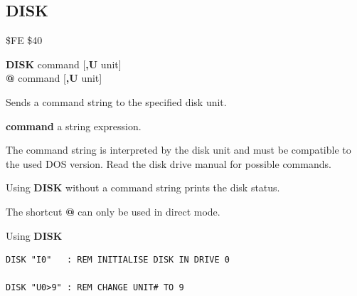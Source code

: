 \subsection{DISK}
\begin{description}[leftmargin=2cm,style=nextline]
\item [Token:]    \$FE \$40

\item [Format:]   {\bf DISK} command [{\bf,U} unit] \\
                  {\bf @} command [{\bf,U} unit]

\item [Usage:]    Sends a command string to the specified disk unit.

                  \unitdefinition

                  {\bf command} a string expression.

\item [Remarks:]  The command string is interpreted by the disk unit and must be compatible to the used DOS version. Read the disk drive manual for possible commands.

                  Using {\bf DISK} without a command string prints the disk status.

                  The shortcut {\bf @} can only be used in direct mode.

\item [Examples:] Using {\bf DISK}

\begin{tcolorbox}[colback=black,coltext=white]
\verbatimfont{\codefont}
\begin{verbatim}
DISK "I0"   : REM INITIALISE DISK IN DRIVE 0

DISK "U0>9" : REM CHANGE UNIT# TO 9
\end{verbatim}
\end{tcolorbox}
\end{description}


\newpage

